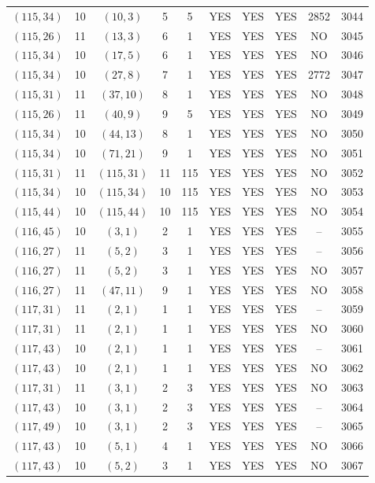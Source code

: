 \begin{longtable}{|c|c|c|c|c|c|c|c|c|c|}
$(115, 34)$ & 10 & $(10, 3)$ & 5 & 5 & YES & YES & YES & 2852 & 3044\\
$(115, 26)$ & 11 & $(13, 3)$ & 6 & 1 & YES & YES & YES & NO & 3045\\
$(115, 34)$ & 10 & $(17, 5)$ & 6 & 1 & YES & YES & YES & NO & 3046\\
$(115, 34)$ & 10 & $(27, 8)$ & 7 & 1 & YES & YES & YES & 2772 & 3047\\
$(115, 31)$ & 11 & $(37, 10)$ & 8 & 1 & YES & YES & YES & NO & 3048\\
$(115, 26)$ & 11 & $(40, 9)$ & 9 & 5 & YES & YES & YES & NO & 3049\\
$(115, 34)$ & 10 & $(44, 13)$ & 8 & 1 & YES & YES & YES & NO & 3050\\
$(115, 34)$ & 10 & $(71, 21)$ & 9 & 1 & YES & YES & YES & NO & 3051\\
$(115, 31)$ & 11 & $(115, 31)$ & 11 & 115 & YES & YES & YES & NO & 3052\\
$(115, 34)$ & 10 & $(115, 34)$ & 10 & 115 & YES & YES & YES & NO & 3053\\
$(115, 44)$ & 10 & $(115, 44)$ & 10 & 115 & YES & YES & YES & NO & 3054\\
$(116, 45)$ & 10 & $(3, 1)$ & 2 & 1 & YES & YES & YES & -- & 3055\\
$(116, 27)$ & 11 & $(5, 2)$ & 3 & 1 & YES & YES & YES & -- & 3056\\
$(116, 27)$ & 11 & $(5, 2)$ & 3 & 1 & YES & YES & YES & NO & 3057\\
$(116, 27)$ & 11 & $(47, 11)$ & 9 & 1 & YES & YES & YES & NO & 3058\\
$(117, 31)$ & 11 & $(2, 1)$ & 1 & 1 & YES & YES & YES & -- & 3059\\
$(117, 31)$ & 11 & $(2, 1)$ & 1 & 1 & YES & YES & YES & NO & 3060\\
$(117, 43)$ & 10 & $(2, 1)$ & 1 & 1 & YES & YES & YES & -- & 3061\\
$(117, 43)$ & 10 & $(2, 1)$ & 1 & 1 & YES & YES & YES & NO & 3062\\
$(117, 31)$ & 11 & $(3, 1)$ & 2 & 3 & YES & YES & YES & NO & 3063\\
$(117, 43)$ & 10 & $(3, 1)$ & 2 & 3 & YES & YES & YES & -- & 3064\\
$(117, 49)$ & 10 & $(3, 1)$ & 2 & 3 & YES & YES & YES & -- & 3065\\
$(117, 43)$ & 10 & $(5, 1)$ & 4 & 1 & YES & YES & YES & NO & 3066\\
$(117, 43)$ & 10 & $(5, 2)$ & 3 & 1 & YES & YES & YES & NO & 3067\\

\end{longtable}
